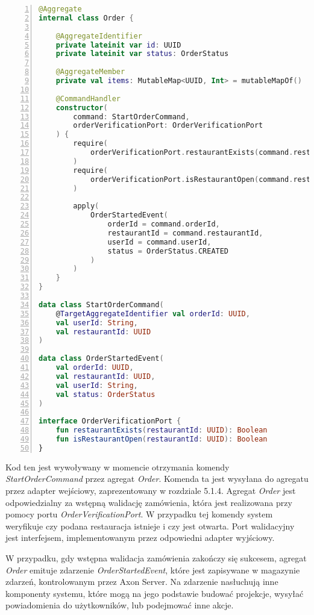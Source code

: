 \begin{lstlisting}[caption={Kod komponentów odpowiedzialnych za rozpoczynanie zamówień},label={lst:server-domain},captionpos=b,language=Kotlin,numbers=left]
@Aggregate
internal class Order {

    @AggregateIdentifier
    private lateinit var id: UUID
    private lateinit var status: OrderStatus

    @AggregateMember
    private val items: MutableMap<UUID, Int> = mutableMapOf()

    @CommandHandler
    constructor(
        command: StartOrderCommand,
        orderVerificationPort: OrderVerificationPort
    ) {
        require(
            orderVerificationPort.restaurantExists(command.restaurantId)
        )
        require(
            orderVerificationPort.isRestaurantOpen(command.restaurantId)
        )

        apply(
            OrderStartedEvent(
                orderId = command.orderId,
                restaurantId = command.restaurantId,
                userId = command.userId,
                status = OrderStatus.CREATED
            )
        )
    }
}

data class StartOrderCommand(
    @TargetAggregateIdentifier val orderId: UUID,
    val userId: String,
    val restaurantId: UUID
)

data class OrderStartedEvent(
    val orderId: UUID,
    val restaurantId: UUID,
    val userId: String,
    val status: OrderStatus
)

interface OrderVerificationPort {
    fun restaurantExists(restaurantId: UUID): Boolean
    fun isRestaurantOpen(restaurantId: UUID): Boolean
}
\end{lstlisting}

Kod ten jest wywoływany w momencie otrzymania komendy \textit{StartOrderCommand} przez agregat \textit{Order}. Komenda ta jest wysyłana do agregatu przez adapter wejściowy, zaprezentowany w rozdziale 5.1.4. Agregat \textit{Order} jest odpowiedzialny za wstępną walidację zamówienia, która jest realizowana przy pomocy portu \textit{OrderVerificationPort}. W przypadku tej komendy system weryfikuje czy podana restauracja istnieje i czy jest otwarta. Port walidacyjny jest interfejsem, implementowanym przez odpowiedni adapter wyjściowy.

W przypadku, gdy wstępna walidacja zamówienia zakończy się sukcesem, agregat \textit{Order} emituje zdarzenie \textit{OrderStartedEvent}, które jest zapisywane w magazynie zdarzeń, kontrolowanym przez Axon Server. Na zdarzenie nasłuchują inne komponenty systemu, które mogą na jego podstawie budować projekcje, wysyłać powiadomienia do użytkowników, lub podejmować inne akcje.

